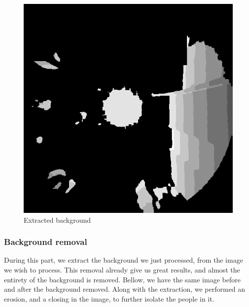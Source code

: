 \documentclass[conference]{IEEEtran}
\begin{document}
\begin{figure}[ht!]
\begin{minipage}[b]{0.22\textwidth}
        \includegraphics[width=\textwidth]{Images/classical/backgroung.png}
        \caption{Extracted background}\label{fig:NetRes3}
    \end{minipage}
\end{figure}

\subsubsection{Background removal}

During this part, we extract the background we just processed, from the image we wish to process. This removal already give us great results, and almost the entirety of the background is removed. Bellow, we have the same image before and after the background removed. Along with the extraction, we performed an erosion, and a closing in the image, to further isolate the people in it.
\end{document}

